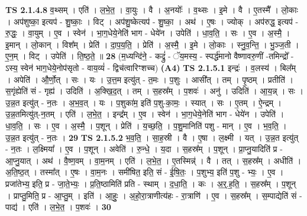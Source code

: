 \documentclass[17pt]{extarticle}
\begin{document}
                  \newline
                                \textbf{ TS 2.1.4.8} \newline
                  व॒थ्सम् । एति॑ । ल॒भे॒त॒ । वा॒युः । वै । अ॒नयोः᳚ । व॒थ्सः । इ॒मे । वै । ए॒तस्मै᳚ । लो॒काः । अप॑शुष्का॒ इत्यप॑ - शु॒ष्काः॒ । विट् । अप॑शु॒ष्केत्यप॑ - शु॒ष्का॒ । अथ॑ । ए॒षः । ज्योक् । अप॑रुद्ध॒ इत्यप॑ - रु॒द्धः॒ । वा॒युम् । ए॒व । स्वेन॑ । भा॒ग॒धेये॒नेति॑ भाग - धेये॑न । उपेति॑ । धा॒व॒ति॒ । सः । ए॒व । अ॒स्मै॒ । इ॒मान् । लो॒कान् । विश᳚म् । प्रेति॑ । दा॒प॒य॒ति॒ । प्रेति॑ । अ॒स्मै॒ । इ॒मे । लो॒काः । स्नु॒व॒न्ति॒ । भु॒ञ्ज॒ती । ए॒न॒म् । विट् । उपेति॑ । ति॒ष्ठ॒ते॒ ॥ \textbf{  28} \newline
                  \newline
                      (म॒ध्यन्दि॑ने॒ - कद्रुं॑ - ॅय॒मस्य॒ - स्पर्द्ध॑मानो वैष्णावरु॒णीं -तमिन्द्रो᳚ - ऽस्य॒ स्वेन॑ भाग॒धेये॒नोप॑सृतो - वाय॒व्यं॑ - द्विच॑त्वारिꣳशच्च)  \textbf{(A4)} \newline \newline
                                \textbf{ TS 2.1.5.1} \newline
                  इन्द्रः॑ । व॒लस्य॑ । बिल᳚म् । अपेति॑ । औ॒र्णो॒त् । सः । यः । उ॒त्त॒म इत्यु॑त् - त॒मः । प॒शुः । आसी᳚त् । तम् । पृ॒ष्ठम् । प्रतीति॑ । स॒गृंह्येति॑ सं - गृह्य॑ । उदिति॑ । अ॒क्खि॒द॒त् । तम् । स॒हस्र᳚म् । प॒शवः॑ । अनु॑ । उदिति॑ । आ॒य॒न्न् । सः । उ॒न्न॒त इत्यु॑त् - न॒तः । अ॒भ॒व॒त् । यः । प॒शुका॑म॒ इति॑ प॒शु-का॒मः॒ । स्यात् । सः । ए॒तम् । ऐ॒न्द्रम् । उ॒न्न॒तमित्यु॑त्-न॒तम् । एति॑ । ल॒भे॒त॒ । इन्द्र᳚म् । ए॒व । स्वेन॑ । भा॒ग॒धेये॒नेति॑ भाग - धेये॑न । उपेति॑ । धा॒व॒ति॒ । सः । ए॒व । अ॒स्मै॒ । प॒शून् । प्रेति॑ । य॒च्छ॒ति॒ । प॒शु॒मानिति॑ पशु - मान् । ए॒व । भ॒व॒ति॒ । उ॒न्न॒त इत्यु॑त् - न॒तः । \textbf{  29} \newline
                  \newline
                                \textbf{ TS 2.1.5.2} \newline
                  भ॒व॒ति॒ । सा॒ह॒स्री । वै । ए॒षा । ल॒क्ष्मी । यत् । उ॒न्न॒त इत्यु॑त् - न॒तः । ल॒क्ष्मिया᳚ । ए॒व । प॒शून् । अवेति॑ । रु॒न्धे॒ । य॒दा । स॒हस्र᳚म् । प॒शून् । प्रा॒प्नु॒यादिति॑ प्र - आ॒प्नु॒यात् । अथ॑ । वै॒ष्ण॒वम् । वा॒म॒नम् । एति॑ । ल॒भे॒त॒ । ए॒तस्मिन्न्॑ । वै । तत् । स॒हस्र᳚म् । अधीति॑ । अ॒ति॒ष्ठ॒त् । तस्मा᳚त् । ए॒षः । वा॒म॒नः । समी॑षित॒ इति॒ सं - ई॒षि॒तः॒ । प॒शुभ्य॒ इति॑ प॒शु - भ्यः॒ । ए॒व । प्रजा॑तेभ्य॒ इति॒ प्र - जा॒ते॒भ्यः॒ । प्र॒ति॒ष्ठामिति॑ प्रति - स्थाम् । द॒धा॒ति॒ । कः । अ॒र्॒.ह॒ति॒ । स॒हस्र᳚म् । प॒शून् । प्राप्तु॒मिति॒ प्र - आ॒प्तु॒म् । इति॑ । आ॒हुः॒ । अ॒हो॒रा॒त्राणीत्य॑हः - रा॒त्राणि॑ । ए॒व । स॒हस्र᳚म् । स॒म्पाद्येति॑ सं - पाद्य॑ । एति॑ । ल॒भे॒त॒ । प॒शवः॑ । \textbf{  30} \newline
\end{document}
